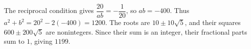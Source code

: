 The reciprocal condition gives $\dfrac{20}{ab}=-\dfrac{1}{20}$, so $ab=-400$. Thus $a^2+b^2=20^2-2(-400)=1200$. The roots are $10\pm 10\sqrt 5$, and their squares $600\pm 200\sqrt 5$ are nonintegers. Since their sum is an integer, their fractional parts sum to $1$, giving $\boxed{1199}$.
